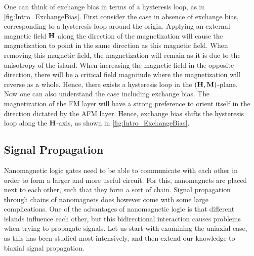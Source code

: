 \documentclass[11pt,a4paper,english,twoside]{article}
\begin{document}
One can think of exchange bias in terms of a hysteresis loop, as in \cref{fig:Intro_ExchangeBias}. First consider the case in absence of exchange bias, corresponding to a hysteresis loop around the origin. Applying an external magnetic field $\vb{H}$ along the direction of the magnetization will cause the magnetization to point in the same direction as this magnetic field. When removing this magnetic field, the magnetization will remain as it is due to the anisotropy of the island. When increasing the magnetic field in the opposite direction, there will be a critical field magnitude where the magnetization will reverse as a whole. Hence, there exists a hysteresis loop in the $(\vb{H}, \vb{M})$-plane. Now one can also understand the case including exchange bias. The magnetization of the FM layer will have a strong preference to orient itself in the direction dictated by the AFM layer. Hence, exchange bias shifts the hysteresis loop along the $\vb{H}$-axis, as shown in \cref{fig:Intro_ExchangeBias}.

\subsection{Signal Propagation}
Nanomagnetic logic gates need to be able to communicate with each other in order to form a larger and more useful circuit. For this, nanomagnets are placed next to each other, such that they form a sort of chain. Signal propagation through chains of nanomagnets does however come with some large complications. One of the advantages of nanomagnetic logic is that different islands influence each other, but this bidirectional interaction causes problems when trying to propagate signals. Let us start with examining the uniaxial case, as this has been studied most intensively, and then extend our knowledge to biaxial signal propagation.
\end{document}
